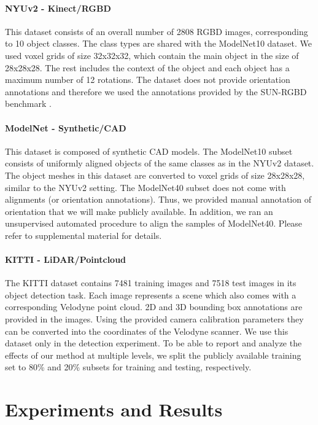 \documentclass{bmvc2k}
\begin{document}
\paragraph{NYUv2 - Kinect/RGBD}
This dataset consists of an overall number of 2808 RGBD images, corresponding to 10 object classes. The class types are shared with the ModelNet10 dataset. We used voxel grids of size 32x32x32, which contain the main object in the size of 28x28x28. The rest includes the context of the object and each object has a maximum number of 12 rotations. The dataset does not provide orientation annotations and therefore we used the annotations provided by the SUN-RGBD benchmark \cite{song2015sun}.


\paragraph{ModelNet - Synthetic/CAD}
This dataset is composed of synthetic CAD models. The ModelNet10 subset consists of uniformly aligned objects of the same classes as in the NYUv2 dataset. The object meshes in this dataset are converted to voxel grids of size 28x28x28, similar to the NYUv2 setting.
The ModelNet40 subset does not come with alignments (or orientation annotations). Thus, we provided manual annotation of orientation that we will make publicly available. In addition, we ran an unsupervised automated procedure to align the samples of ModelNet40. Please refer to supplemental material for details.

\paragraph{KITTI - LiDAR/Pointcloud}
The KITTI dataset \cite{Geiger2012CVPR} contains 7481 training images and 7518 test images in its object detection task. Each image represents a scene which also comes with a corresponding Velodyne point cloud. 2D and 3D bounding box annotations are provided in the images. Using the provided camera calibration parameters they can be converted into the coordinates of the Velodyne scanner. 
We use this dataset only in the detection experiment. To be able to report and analyze the effects of our method at multiple levels, we split the publicly available training set to 80\% and 20\% subsets for training and testing, respectively.

\section{Experiments and Results}
\end{document}
